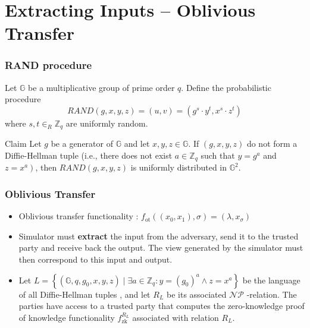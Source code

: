 \documentclass{beamer}
\begin{document}
    \section{Extracting Inputs – Oblivious Transfer}
    \sectionpage
    \begin{frame}
        \frametitle{RAND procedure}
        \begin{definition}
            Let $\mathbb{G}$ be a multiplicative group of prime order $q$. Define the probabilistic procedure
            $$
            R A N D(g, x, y, z)=(u, v)=\left(g^{s} \cdot y^{t}, x^{s} \cdot z^{t}\right)
            $$
            where $s, t \in_{R} \mathbb{Z}_{q}$ are uniformly random.
        \end{definition}
        \begin{block}{Claim}
            Let $g$ be a generator of $\mathbb{G}$ and let $x, y, z \in \mathbb{G} .$ If $(g, x, y, z)$ do not form a Diffie-Hellman tuple (i.e., there does not exist $a \in \mathbb{Z}_{q}$ such that $y=g^{a}$ and $\left.z=x^{a}\right)$, then $R A N D(g, x, y, z)$ is uniformly distributed in $\mathbb{G}^{2} .$
        \end{block}
    
        
    
    \end{frame}
    
    \begin{frame}
        \frametitle{Oblivious Transfer}
        \begin{itemize}
            \item  Oblivious transfer functionality : $f_{\text {ot}}\left(\left(x_{0}, x_{1}\right), \sigma\right)=\left(\lambda, x_{\sigma}\right)$ 
            \item Simulator must \textbf{extract} the input from the adversary, send it to the trusted party and receive back the output. The view generated by the simulator must then correspond to this input and output.
            \item Let $L=\left\{\left(\mathbb{G}, q, g_{0}, x, y, z\right) \mid \exists a \in \mathbb{Z}_{q}: y=\left(g_{0}\right)^{a} \wedge z=x^{a}\right\}$ be
            the language of all Diffie-Hellman tuples , and let $R_{L}$ be its associated $\mathcal{N} \mathcal{P}$ -relation. The parties have access to a trusted party that computes the zero-knowledge proof of knowledge functionality $f_{\mathrm{zk}}^{R_{L}}$ associated with relation $R_{L}$.
        \end{itemize}
    
        
    
    \end{frame}
\end{document}
